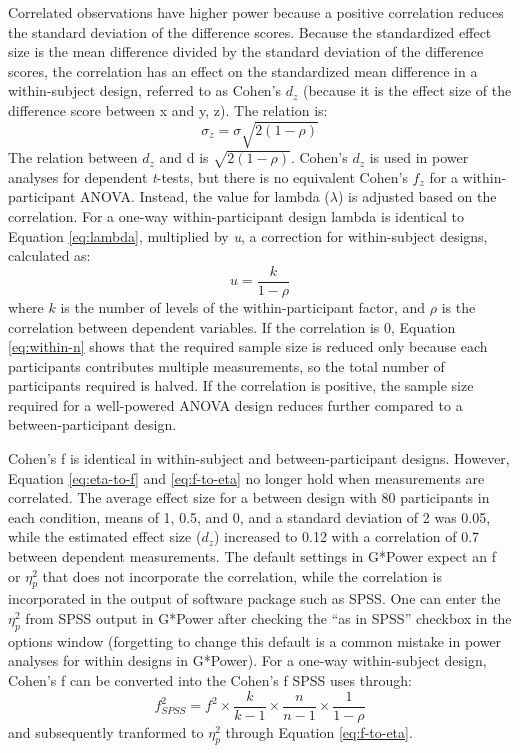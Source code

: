 \documentclass[,jou,floatsintext]{apa6}
\begin{document}
Correlated observations have higher power because a positive correlation reduces the standard deviation of the difference scores.
Because the standardized effect size is the mean difference divided by the standard deviation of the difference scores, the correlation has an effect on the standardized mean difference in a within-subject design, referred to as Cohen's \(d_z\) (because it is the effect size of the difference score between x and y, z). The relation is:
\begin{equation}
\sigma_{z}=\sigma\sqrt{2(1-\rho)}
\end{equation}
The relation between \(d_z\) and d is \(\sqrt{2(1-\rho)}\).
Cohen's \(d_z\) is used in power analyses for dependent \emph{t}-tests, but there is no equivalent Cohen's \(f_z\) for a within-participant ANOVA.
Instead, the value for lambda (\(\lambda\)) is adjusted based on the correlation.
For a one-way within-participant design lambda is identical to Equation \eqref{eq:lambda}, multiplied by \emph{u}, a correction for within-subject designs, calculated as:
\begin{equation}
u = \frac{k}{1-\rho}
\end{equation}
where \(k\) is the number of levels of the within-participant factor, and \(\rho\) is the correlation between dependent variables.
If the correlation is 0, Equation \eqref{eq:within-n} shows that the required sample size is reduced only because each participants contributes multiple measurements, so the total number of participants required is halved.
If the correlation is positive, the sample size required for a well-powered ANOVA design reduces further compared to a between-participant design.

Cohen's f is identical in within-subject and between-participant designs.
However, Equation \eqref{eq:eta-to-f} and \eqref{eq:f-to-eta} no longer hold when measurements are correlated.
The average effect size for a between design with 80 participants in each condition, means of 1, 0.5, and 0, and a standard deviation of 2 was 0.05, while the estimated effect size (\(d_z\)) increased to 0.12 with a correlation of 0.7 between dependent measurements.
The default settings in G*Power expect an f or \(\eta_p^2\) that does not incorporate the correlation, while the correlation is incorporated in the output of software package such as SPSS.
One can enter the \(\eta_p^2\) from SPSS output in G*Power after checking the \enquote{as in SPSS} checkbox in the options window (forgetting to change this default is a common mistake in power analyses for within designs in G*Power).
For a one-way within-subject design, Cohen's f can be converted into the Cohen's f SPSS uses through:
\begin{equation}
f^2_{SPSS} = f^2 \times \frac{k}{k-1} \times \frac{n}{n-1} \times \frac{1}{1-\rho}
\end{equation}
and subsequently tranformed to \(\eta_p^2\) through Equation \eqref{eq:f-to-eta}.
\end{document}
